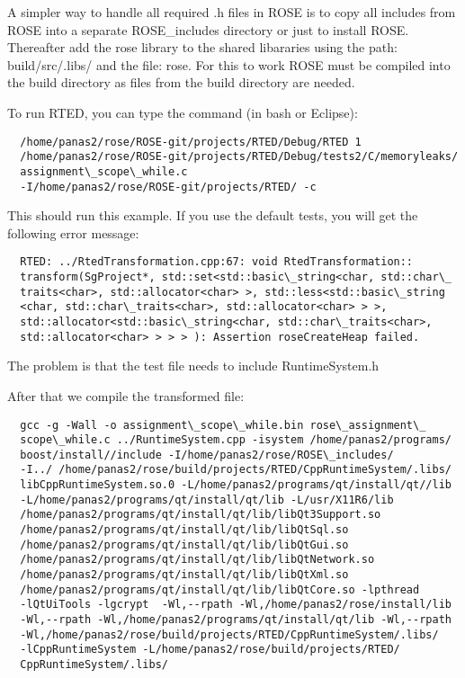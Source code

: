 A simpler way to handle all required .h files in ROSE is to copy all includes from ROSE into a separate ROSE\_includes directory or just to install ROSE.
Thereafter add the rose library to the shared libararies using the path: build/src/.libs/ and the file: rose.
For this to work ROSE must be compiled into the build directory as files from the build directory are needed.

To run RTED, you can type the command (in bash or Eclipse):

\begin{verbatim}
  /home/panas2/rose/ROSE-git/projects/RTED/Debug/RTED 1  
  /home/panas2/rose/ROSE-git/projects/RTED/Debug/tests2/C/memoryleaks/
  assignment\_scope\_while.c  
  -I/home/panas2/rose/ROSE-git/projects/RTED/ -c
\end{verbatim}

This should run this example. If you use the default tests, you will get the following error message: 

\begin{verbatim}
  RTED: ../RtedTransformation.cpp:67: void RtedTransformation::
  transform(SgProject*, std::set<std::basic\_string<char, std::char\_
  traits<char>, std::allocator<char> >, std::less<std::basic\_string
  <char, std::char\_traits<char>, std::allocator<char> > >, 
  std::allocator<std::basic\_string<char, std::char\_traits<char>, 
  std::allocator<char> > > > ): Assertion roseCreateHeap failed.
\end{verbatim}

The problem is that the test file needs to include RuntimeSystem.h

After that we compile the transformed file:

\begin{verbatim}
  gcc -g -Wall -o assignment\_scope\_while.bin rose\_assignment\_
  scope\_while.c ../RuntimeSystem.cpp -isystem /home/panas2/programs/
  boost/install//include -I/home/panas2/rose/ROSE\_includes/ 
  -I../ /home/panas2/rose/build/projects/RTED/CppRuntimeSystem/.libs/
  libCppRuntimeSystem.so.0 -L/home/panas2/programs/qt/install/qt//lib 
  -L/home/panas2/programs/qt/install/qt/lib -L/usr/X11R6/lib 
  /home/panas2/programs/qt/install/qt/lib/libQt3Support.so 
  /home/panas2/programs/qt/install/qt/lib/libQtSql.so 
  /home/panas2/programs/qt/install/qt/lib/libQtGui.so 
  /home/panas2/programs/qt/install/qt/lib/libQtNetwork.so 
  /home/panas2/programs/qt/install/qt/lib/libQtXml.so 
  /home/panas2/programs/qt/install/qt/lib/libQtCore.so -lpthread 
  -lQtUiTools -lgcrypt  -Wl,--rpath -Wl,/home/panas2/rose/install/lib 
  -Wl,--rpath -Wl,/home/panas2/programs/qt/install/qt/lib -Wl,--rpath 
  -Wl,/home/panas2/rose/build/projects/RTED/CppRuntimeSystem/.libs/ 
  -lCppRuntimeSystem -L/home/panas2/rose/build/projects/RTED/
  CppRuntimeSystem/.libs/
\end{verbatim}


